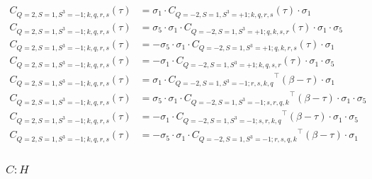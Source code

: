 \begin{equation*}
  \begin{aligned}
    C_{Q=2,S=1,S^3=-1;k,q,r,s} (\tau) &= \sigma_1\cdot{C_{Q=-2,S=1,S^3=+1;k,q,r,s}} (\tau)\cdot\sigma_1 
    \\
    C_{Q=2,S=1,S^3=-1;k,q,r,s} (\tau) &= \sigma_5\cdot \sigma_1\cdot{C_{Q=-2,S=1,S^3=+1;q,k,s,r}} (\tau)\cdot\sigma_1\cdot\sigma_5
    \\
    C_{Q=2,S=1,S^3=-1;k,q,r,s} (\tau) &= - \sigma_5\cdot \sigma_1\cdot{C_{Q=-2,S=1,S^3=+1;q,k,r,s}} (\tau)\cdot\sigma_1
    \\
    C_{Q=2,S=1,S^3=-1;k,q,r,s} (\tau) &= - \sigma_1\cdot{C_{Q=-2,S=1,S^3=+1;k,q,s,r}} (\tau)\cdot\sigma_1\cdot\sigma_5
    \\
    C_{Q=2,S=1,S^3=-1;k,q,r,s} (\tau) &= \sigma_1\cdot{C_{Q=-2,S=1,S^3=-1;r,s,k,q}}^\top (\beta-\tau) \cdot\sigma_1 
    \\
    C_{Q=2,S=1,S^3=-1;k,q,r,s} (\tau) &= \sigma_5\cdot \sigma_1\cdot{C_{Q=-2,S=1,S^3=-1;s,r,q,k}}^\top (\beta-\tau) \cdot\sigma_1\cdot\sigma_5
    \\
    C_{Q=2,S=1,S^3=-1;k,q,r,s} (\tau) &= - \sigma_1\cdot{C_{Q=-2,S=1,S^3=-1;s,r,k,q}}^\top (\beta-\tau) \cdot\sigma_1\cdot\sigma_5
    \\
    C_{Q=2,S=1,S^3=-1;k,q,r,s} (\tau) &= - \sigma_5\cdot \sigma_1\cdot{C_{Q=-2,S=1,S^3=-1;r,s,q,k}}^\top (\beta-\tau) \cdot\sigma_1
    \\
  \end{aligned}
\end{equation*}

\subsubsection{$C : H$}

